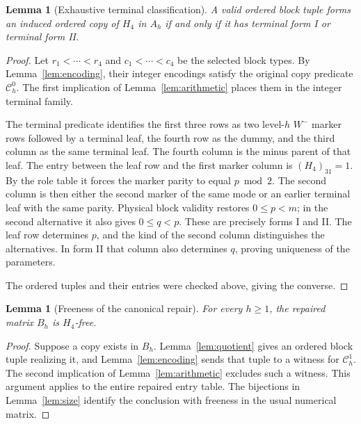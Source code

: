 \documentclass[11pt]{article}
\newtheorem{lemma}[theorem]{Lemma}
\begin{document}
\begin{lemma}[Exhaustive terminal classification]\label{lem:classification}
A valid ordered block tuple forms an induced ordered copy of $H_4$ in
$A_h$ if and only if it has terminal form I or terminal form II.
\end{lemma}
\begin{proof}
Let $r_1<\cdots<r_4$ and $c_1<\cdots<c_4$ be the selected block
types. By Lemma~\ref{lem:encoding}, their integer encodings satisfy the
original copy predicate $\mathcal C_h^0$. The first implication of
Lemma~\ref{lem:arithmetic} places them in the integer terminal family.

The terminal predicate identifies the first three rows as two level-$h$
$W^-$ marker rows followed by a terminal leaf, the fourth row as the dummy,
and the third column as the same terminal leaf. The fourth column is the
minus parent of that leaf. The entry between the leaf row and the first
marker column is $(H_4)_{31}=1$. By the role table it forces the marker
parity to equal $p\bmod2$. The second column is
then either the second marker of the same mode or an earlier terminal leaf
with the same parity. Physical block validity restores $0\le p<m$;
in the second alternative it also gives $0\le q<p$. These are precisely
forms I and II. The leaf row determines $p$, and the kind of the second
column distinguishes the alternatives. In form II that column also
determines $q$, proving uniqueness of the parameters.

The ordered tuples and their entries were checked above, giving the
converse.
\end{proof}

\begin{lemma}[Freeness of the canonical repair]\label{lem:repair}
For every $h\ge1$, the repaired matrix $B_h$ is $H_4$-free.
\end{lemma}
\begin{proof}
Suppose a copy exists in $B_h$. Lemma~\ref{lem:quotient} gives an ordered
block tuple realizing it, and Lemma~\ref{lem:encoding} sends that tuple
to a witness for $\mathcal C_h^1$. The second implication of
Lemma~\ref{lem:arithmetic} excludes such a witness. This argument applies
to the entire repaired entry table. The bijections in
Lemma~\ref{lem:size} identify the conclusion with freeness in the usual
numerical matrix.
\end{proof}
\end{document}
